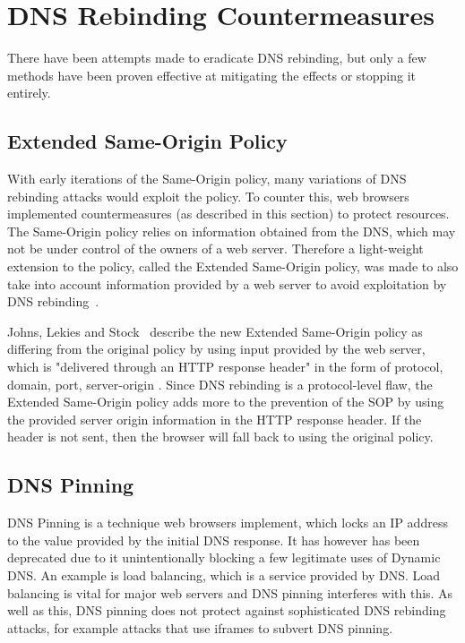 \chapter{DNS Rebinding Countermeasures}

There have been attempts made to eradicate DNS rebinding, but only
a few methods have been proven effective at mitigating the effects
or stopping it entirely.

\section{Extended Same-Origin Policy}

With early iterations of the Same-Origin policy, many variations of
DNS rebinding attacks would exploit the policy. To counter this, web
browsers implemented countermeasures (as described in this section) to
protect resources. The Same-Origin policy relies on information
obtained from the DNS, which may not be under control of the owners
of a web server. Therefore a light-weight extension to the policy,
called the Extended Same-Origin policy, was made to also take into
account information provided by a web server to avoid exploitation by
DNS rebinding~\cite{johns2013eradicating}.

\vspace{0.5cm}

Johns, Lekies and Stock~\cite{johns2013eradicating} describe the new Extended
Same-Origin policy as differing from the original policy by using input
provided by the web server, which is "delivered through an HTTP response
header" in the form of { protocol, domain, port, server-origin }. Since DNS
rebinding is a protocol-level flaw, the Extended Same-Origin policy adds more
to the prevention of the SOP by using the provided server origin information in
the HTTP response header. If the header is not sent, then the browser will
fall back to using the original policy.

\section{DNS Pinning}

DNS Pinning is a technique web browsers implement, which locks an IP
address to the value provided by the initial DNS response. It has
however has been deprecated due to it unintentionally blocking a
few legitimate uses of Dynamic DNS. An example is load balancing,
which is a service provided by DNS. Load balancing is vital for
major web servers and DNS pinning interferes with this.
As well as this, DNS pinning does not protect against sophisticated
DNS rebinding attacks, for example attacks that use iframes to subvert DNS
pinning.

